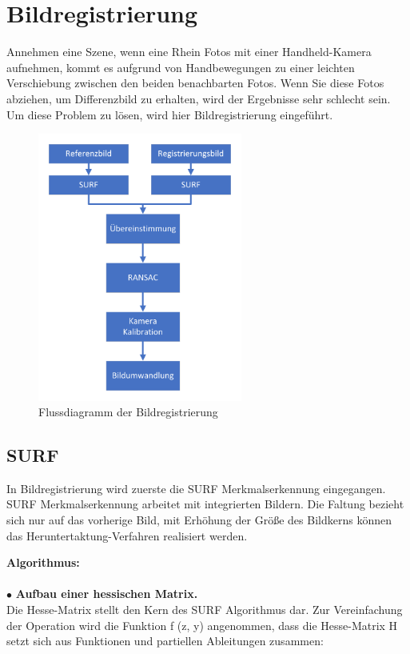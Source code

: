 \section{Bildregistrierung} 

Annehmen eine Szene, wenn eine Rhein Fotos mit einer Handheld-Kamera aufnehmen, kommt es aufgrund von Handbewegungen zu einer leichten Verschiebung zwischen den beiden benachbarten Fotos. Wenn Sie diese Fotos abziehen, um Differenzbild zu erhalten, wird der Ergebnisse sehr schlecht sein. Um diese Problem zu lösen, wird hier Bildregistrierung eingeführt.

\begin{figure}[H]
 \centering 
 \includegraphics[keepaspectratio,width=0.6\textwidth]{images/4_ZweiteErfahrung/Bildregistration.pdf}
 \caption{Flussdiagramm der Bildregistrierung}
 \label{fig:Bildregistrierung}
\end{figure}

\subsection{SURF}
In Bildregistrierung wird zuerste die SURF\cite{Surf} Merkmalserkennung eingegangen. SURF Merkmalserkennung arbeitet mit integrierten Bildern. Die Faltung bezieht sich nur auf das vorherige Bild, mit Erhöhung der Größe des Bildkerns können das Heruntertaktung-Verfahren realisiert werden. 

\textbf{Algorithmus:}\\
\\
$\bullet$ \textbf{Aufbau einer hessischen Matrix.}\\
Die Hesse-Matrix stellt den Kern des SURF Algorithmus dar. Zur Vereinfachung der Operation wird die Funktion f (z, y) angenommen, dass die Hesse-Matrix H setzt sich aus Funktionen und partiellen Ableitungen zusammen:

